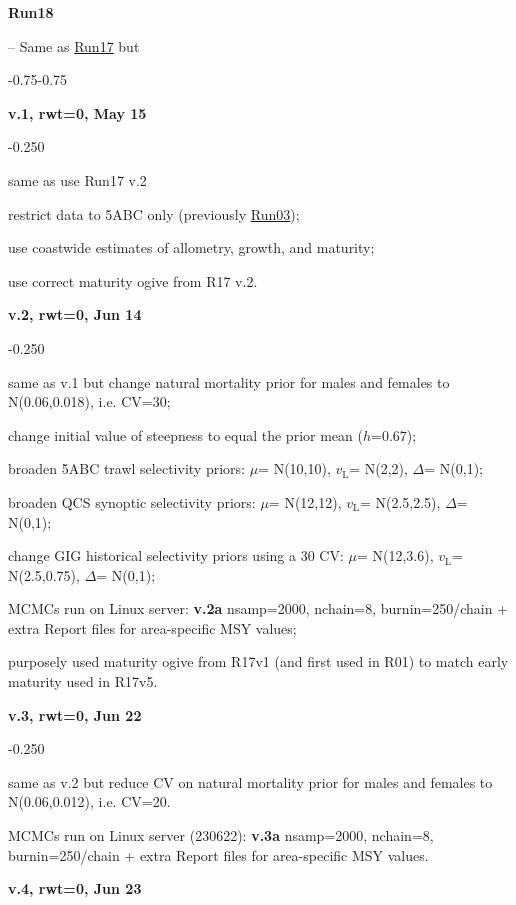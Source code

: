 \hypertarget{R18}{\textbf{Run18}} -- Same as \hyperlink{R17}{Run17} but
\begin{itemize_csas}{-0.75}{-0.75}
	\item \textbf{v.1, rwt=0, May 15}
	\begin{itemize_csas}{-0.25}{0}
		\item same as use Run17 v.2
		\item restrict data to 5ABC only (previously \hyperlink{R03}{Run03});
		\item use coastwide estimates of allometry, growth, and maturity;
		\item use correct maturity ogive from R17 v.2.
	\end{itemize_csas}
	\item \textbf{v.2, rwt=0, Jun 14}
	\begin{itemize_csas}{-0.25}{0}
		\item same as v.1 but change natural mortality prior for males and females to N(0.06,0.018), i.e. CV=30\pc{};
		\item change initial value of steepness to equal the prior mean ($h$=0.67);
		\item broaden 5ABC trawl selectivity priors: $\mu$= N(10,10), $v_\text{L}$= N(2,2), $\Delta$= N(0,1);
		\item broaden QCS synoptic selectivity priors: $\mu$= N(12,12), $v_\text{L}$= N(2.5,2.5), $\Delta$= N(0,1);
		\item change GIG historical selectivity priors using a 30\pc{} CV: $\mu$= N(12,3.6), $v_\text{L}$= N(2.5,0.75), $\Delta$= N(0,1);
		\item MCMCs run on Linux server: \textbf{v.2a} nsamp=2000, nchain=8, burnin=250/chain + extra Report files for area-specific MSY values;
		\item \alert{purposely used maturity ogive from R17v1 (and first used in R01) to match early maturity used in R17v5.}
	\end{itemize_csas}
	\item \textbf{v.3, rwt=0, Jun 22}
	\begin{itemize_csas}{-0.25}{0}
		\item same as v.2 but reduce CV on natural mortality prior for males and females to N(0.06,0.012), i.e. CV=20\pc{}.
		\item MCMCs run on Linux server (230622): \textbf{v.3a} nsamp=2000, nchain=8, burnin=250/chain + extra Report files for area-specific MSY values.
	\end{itemize_csas}
	\item \textbf{v.4, rwt=0, Jun 23}

\end{itemize_csas}
